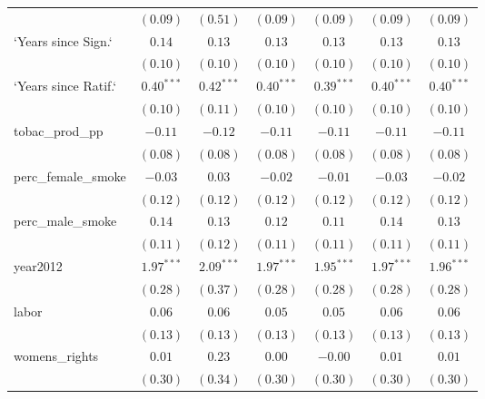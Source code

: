 \begin{table}[!h]
\begin{center}
\begin{tabular}{l c c c c c c }
                        & $(0.09)$     & $(0.51)$     & $(0.09)$     & $(0.09)$     & $(0.09)$     & $(0.09)$     \\
`Years since Sign.`     & $0.14$       & $0.13$       & $0.13$       & $0.13$       & $0.13$       & $0.13$       \\
                        & $(0.10)$     & $(0.10)$     & $(0.10)$     & $(0.10)$     & $(0.10)$     & $(0.10)$     \\
`Years since Ratif.`    & $0.40^{***}$ & $0.42^{***}$ & $0.40^{***}$ & $0.39^{***}$ & $0.40^{***}$ & $0.40^{***}$ \\
                        & $(0.10)$     & $(0.11)$     & $(0.10)$     & $(0.10)$     & $(0.10)$     & $(0.10)$     \\
tobac\_prod\_pp         & $-0.11$      & $-0.12$      & $-0.11$      & $-0.11$      & $-0.11$      & $-0.11$      \\
                        & $(0.08)$     & $(0.08)$     & $(0.08)$     & $(0.08)$     & $(0.08)$     & $(0.08)$     \\
perc\_female\_smoke     & $-0.03$      & $0.03$       & $-0.02$      & $-0.01$      & $-0.03$      & $-0.02$      \\
                        & $(0.12)$     & $(0.12)$     & $(0.12)$     & $(0.12)$     & $(0.12)$     & $(0.12)$     \\
perc\_male\_smoke       & $0.14$       & $0.13$       & $0.12$       & $0.11$       & $0.14$       & $0.13$       \\
                        & $(0.11)$     & $(0.12)$     & $(0.11)$     & $(0.11)$     & $(0.11)$     & $(0.11)$     \\
year2012                & $1.97^{***}$ & $2.09^{***}$ & $1.97^{***}$ & $1.95^{***}$ & $1.97^{***}$ & $1.96^{***}$ \\
                        & $(0.28)$     & $(0.37)$     & $(0.28)$     & $(0.28)$     & $(0.28)$     & $(0.28)$     \\
labor                   & $0.06$       & $0.06$       & $0.05$       & $0.05$       & $0.06$       & $0.06$       \\
                        & $(0.13)$     & $(0.13)$     & $(0.13)$     & $(0.13)$     & $(0.13)$     & $(0.13)$     \\
womens\_rights          & $0.01$       & $0.23$       & $0.00$       & $-0.00$      & $0.01$       & $0.01$       \\
                        & $(0.30)$     & $(0.34)$     & $(0.30)$     & $(0.30)$     & $(0.30)$     & $(0.30)$     \\

\end{tabular}
\end{center}
\end{table}
